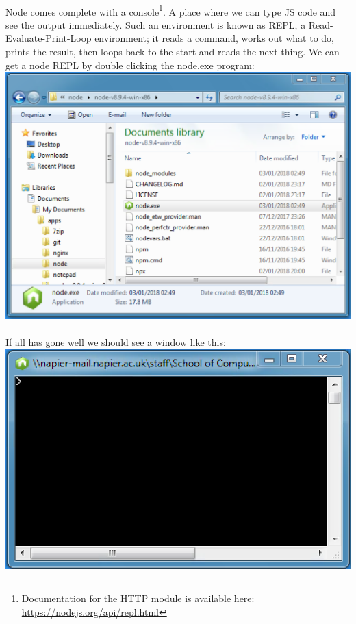 \documentclass[10pt, a4paper, twosize]{article}
\begin{document}
\paragraph{} Node comes complete with a console\footnote{Documentation for the HTTP module is available here: \url{https://nodejs.org/api/repl.html}}. A place where we can type JS code and see the output immediately. Such an environment is known as REPL, a Read-Evaluate-Print-Loop environment; it reads a command, works out what to do, prints the result, then loops back to the start and reads the next thing. We can get a node REPL by double clicking the node.exe program:\\

\includegraphics[width=.8\textwidth]{images/node_executable}

\paragraph{} If all has gone well we should see a window like this:\\

\includegraphics[width=.8\textwidth]{images/node_repl}
\end{document}
